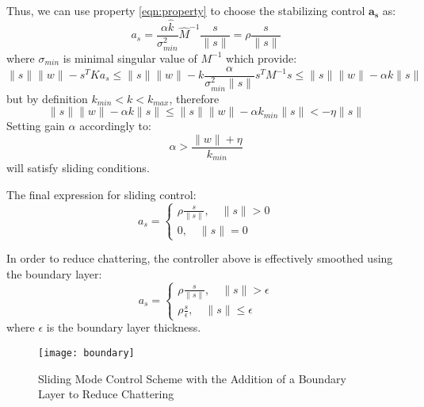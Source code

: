    Thus, we can use property \ref*{eqn:property} to choose the stabilizing control 
    $\mathbf{a_s}$ as:
    \begin{equation}
        a_s = \frac{\alpha \hat{k}}{\sigma_{min}^2}\hat{M}^{-1}\frac{s}{\|s\|} = 
        \rho \frac{s}{\|s\|} 
    \end{equation}
    where $\sigma_{min}$ is minimal singular value of $M^{-1}$
    which provide:
    \begin{equation}
        \|s\|\|w\| - s^TKa_s \leq 
        \|s\|\|w\| - k \frac{\alpha}{\sigma^2_{min}\|s\|}s^TM^{-1}s \leq 
        \|s\|\|w\| - \alpha k \|s\|
    \end{equation}
    but by definition $k_{min} < k < k_{max}$, therefore
    \begin{equation}
        \|s\|\|w\| - \alpha k \|s\| \leq
        \|s\|\|w\| - \alpha k_{min} \|s\| < - \eta \|s\|
    \end{equation}
    Setting gain $\alpha$ accordingly to:
    \begin{equation}
    \alpha > \frac{\|w\| + \eta}{k_{min}}
    \end{equation}
    will satisfy sliding conditions.

    The final expression for sliding control:
    \begin{equation}   
    a_s = 
    \begin{cases}
    \rho \frac{s}{\|s\|}, \quad \|s\| > 0\\
    0, \quad \|s\| = 0 
    \end{cases}
    \end{equation}

    In order to reduce chattering, the controller above is effectively smoothed using
    the boundary layer:
    \begin{equation}
    a_s = 
    \begin{cases}
    \rho \frac{s}{\|s\|}, \quad \|s\| >\epsilon\\
    \rho \frac{s}{\epsilon}, \quad \|s\| \leq\epsilon
    \end{cases}
    \end{equation}
    where $\epsilon$ is the boundary layer thickness.

    \begin{figure}[H]
        \centering\texttt{[image: boundary]}
        \caption{Sliding Mode Control Scheme with the Addition of a Boundary Layer to Reduce Chattering}
        \label{image:boundary}
    \end{figure}

